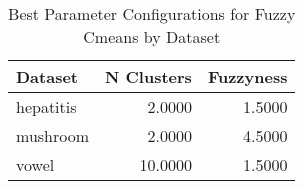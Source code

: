 \begin{table*}[ht!]
\caption{Best Parameter Configurations for Fuzzy Cmeans by Dataset}
\label{tab:best_configs_fuzzy_cmeans_config}
\begin{tabular}{lrr}
Dataset & N Clusters & Fuzzyness \\\midrule

hepatitis & 2.0000 & 1.5000 \\
mushroom & 2.0000 & 4.5000 \\
vowel & 10.0000 & 1.5000 \\
\end{tabular}
\end{table*}

